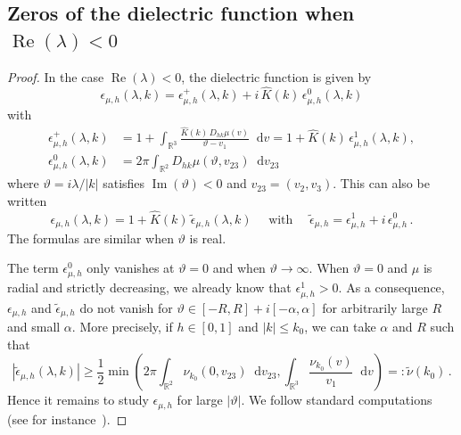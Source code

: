 \documentclass[a4paper,12pt]{amsart} %
\theoremstyle{plain}
\theoremstyle{definition}
\newcommand		{\RR}		{\mathbb R}			%
\newcommand		{\R}		{\RR}
\newcommand		{\Rd}		{\R^3}
\newcommand		{\lt}			{\left}				%
\newcommand		{\rt}			{\right}			%
\renewcommand	{\(}			{\lt(}
\renewcommand	{\)}			{\rt)}
\newcommand		{\n}[1]			{\lt\lvert{#1}\rt\rvert}	%
\renewcommand		{\d}		{\mathop{}\!\mathrm{d}}		%
\DeclareMathOperator{\re}		{Re}				%
\DeclareMathOperator{\im}		{Im}				%
\renewcommand	{\Re}[1]		{\re\!\( #1 \)}		%
\renewcommand	{\Im}[1]		{\im\!\( #1 \)}		%
\newcommand		{\intd}			{\int_{\Rd}}
\newcommand	{\h}			{h}
\begin{document}

\subsection{Zeros of the dielectric function when \texorpdfstring{$\Re\lambda < 0$}{lambda has a negative real part}}\label{sec:dielsmall}


	\begin{proof}
		In the case $\Re{\lambda} < 0$, the dielectric function is given by 
		\begin{equation*}
			\epsilon_{\mu,\h}(\lambda,k) = \epsilon_{\mu,\h}^+(\lambda,k) + i\,\widehat{K}(k) \,\epsilon_{\mu,\h}^0(\lambda,k)
		\end{equation*}
		with
		\begin{align*}
			\epsilon_{\mu,\h}^+(\lambda,k) &= 1 + \intd \frac{\widehat{K}(k) \, D_{h k}\mu(v)}{\vartheta - v_1}\d v
			= 1 + \widehat{K}(k) \, \epsilon_{\mu,\h}^1(\lambda,k),
			\\
			\epsilon_{\mu,\h}^0(\lambda,k) &= 2\pi\int_{\R^2} D_{h k} \mu(\vartheta, v_{23}) \d v_{23}
		\end{align*}
		where $\vartheta = i\lambda/\n{k}$ satisfies $\Im{\vartheta}< 0$ and $v_{23} = (v_2,v_3)$. This can also be written
		\begin{equation}\label{eq:def_tildeps}
			\epsilon_{\mu,\h}(\lambda,k) = 1 + \widehat{K}(k) \,\tilde{\epsilon}_{\mu,\h}(\lambda,k) \quad \text{ with }\quad \tilde{\epsilon}_{\mu,\h} = \epsilon_{\mu,\h}^1 + i\,\epsilon_{\mu,\h}^0 \, .
		\end{equation} 
		The formulas are similar when $\vartheta$ is real. 
		
		The term $\epsilon_{\mu,\h}^0$ only vanishes at $\vartheta = 0$ and when $\vartheta\to\infty$. When $\vartheta=0$ and $\mu$ is radial and strictly decreasing, we already know that $\epsilon_{\mu,\h}^1 > 0$. As a consequence, $\epsilon_{\mu,\h}$ and $\tilde{\epsilon}_{\mu,\h}$ do not vanish for $\vartheta \in \lt[-R,R\rt] + i\lt[-\alpha,\alpha\rt]$ for arbitrarily large $R$ and small $\alpha$. More precisely, if $h\in [0,1]$ and $\n{k}\leq k_0$, we can take $\alpha$ and $R$ such that
		\begin{equation}\label{eq:bound_convexity_mu_2}
			\n{\tilde{\epsilon}_{\mu,\h}(\lambda,k)} \geq \frac{1}{2} \min\lt( 2\pi \int_{\R^2} \nu_{k_0}(0,v_{23}) \d v_{23}, 
			\intd \frac{\nu_{k_0}(v)}{v_1} \d v \rt) =: \tilde{\nu}(k_0)\, .
		\end{equation}
		Hence it remains to study $\epsilon_{\mu,\h}$ for large $\n{\vartheta}$. We follow standard computations (see for instance~\cite[p. 28]{schekochihin_lectures_2023}).


\end{proof}
\end{document}
